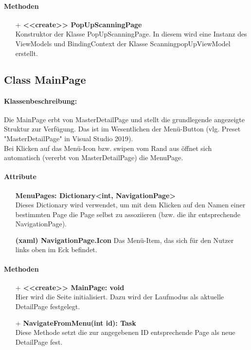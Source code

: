 \documentclass[a4paper,12pt]{article}
\begin{document}
		\paragraph{Methoden}
		\begin{itemize}
		\item[+] \textbf{<<create>> PopUpScanningPage}\\Konstruktor der Klasse PopUpScanningPage. In diesem wird eine Instanz des ViewModels und BindingContext der Klasse ScanningpopUpViewModel erstellt.
		\end{itemize}

	\subsection{Class MainPage}
		\paragraph{Klassenbeschreibung:}
		Die MainPage erbt von MasterDetailPage und stellt die grundlegende angezeigte Struktur zur Verfügung. Das ist im Wesentlichen der Menü-Button (vlg. Preset "MasterDetailPage" in Visual Studio 2019).\\
		Bei Klicken auf das Menü-Icon bzw. swipen vom Rand aus öffnet sich automatisch (vererbt von MasterDetailPage) die MenuPage.
		\paragraph{Attribute}
		\begin{itemize}
			\item [] \textbf{MenuPages: Dictionary<int, NavigationPage>}\\ Dieses Dictionary wird verwendet, um mit dem Klicken auf den Namen einer bestimmten Page die Page selbst zu assoziieren (bzw. die ihr entsprechende NavigationPage).
			\item [] \textbf{(xaml) NavigationPage.Icon} Das Menü-Item, das sich für den Nutzer links oben im Eck befindet.
		\end{itemize}
		\paragraph{Methoden}
		\begin{itemize}
			\item [+] \textbf{<<create>> MainPage: void}\\ Hier wird die Seite initialisiert. Dazu wird der Laufmodus als aktuelle DetailPage festgelegt.
			\item [+] \textbf{NavigateFromMenu(int id): Task}\\ Diese Methode setzt die zur angegebenen ID entsprechende Page als neue DetailPage fest.
		\end{itemize}
\end{document}
